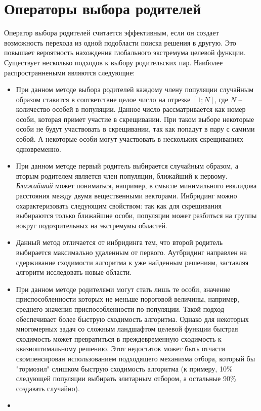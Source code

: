 \section{Операторы выбора родителей}
Оператор выбора родителей считается эффективным, если он создает возможность перехода из одной подобласти поиска решения в другую. Это повышает вероятность нахождения глобального экстремума целевой функции. Существует несколько подходов к выбору родительских пар. Наиболее распространнеными являются следующие:
\begin{itemize}[label=$\ast$]
	\item {}

При данном методе выбора родителей каждому члену популяции случайным образом ставится в соответствие целое число на отрезке $[1; N]$, где $N$ -- количество особей в популяции. Данное число рассматривается как номер особи, которая примет участие в скрещивании. При таком выборе некоторые особи не будут участвовать в скрещивании, так как попадут в пару с самими собой. А некоторые особи могут участвовать в нескольких скрещиваниях одновременно.
	\item {}

При данном методе первый родитель выбирается случайным образом, а вторым родителем является член популяции, ближайший к первому. \textit{Ближайший} может пониматься, например, в смысле минимального евклидова расстояния между двумя вещественными векторами.
Инбридинг можно охарактеризовать следующим свойством: так как для скрещивания выбираются только ближайшие особи, популяции может разбиться на группы вокруг подозрительных на экстремумы областей.
	\item {}

Данный метод отличается от инбридинга тем, что второй родитель выбирается максимально удаленным от первого.
Аутбридинг направлен на сдерживание сходимости алгоритма к уже найденным решениям, заставляя алгоритм исследовать новые области.
	\item {}

При данном методе родителями могут стать лишь те особи, значение приспособленности которых не меньше пороговой величины, например, среднего значения приспособленности по популяции. Такой подход обеспечивает более быструю сходимость алгоритма. Однако для некоторых многомерных задач со сложным ландшафтом целевой функции быстрая сходимость может превратиться в преждевременную сходимость к квазиоптимальному решению. Этот недостаток может быть отчасти скомпенсирован использованием подходящего механизма отбора, который бы "тормозил" слишком быструю сходимость алгоритма (к примеру, 10\% следующей популяции выбирать элитарным отбором, а остальные 90\% создавать случайно).
	\item {}


\end{itemize}

